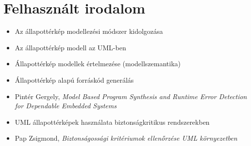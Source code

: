 \begin{fektetett}
\end{fektetett}



%

\section*{Felhasznált irodalom}

\begin{itemize}
	\item Az állapottérkép modellezési módszer kidolgozása~\cite{DBLP:journals/scp/Harel87, DBLP:conf/hopl/Harel07}
	\item Az állapottérkép modell az UML-ben~\cite{UML}
	\item Állapottérkép modellek értelmezése (modellszemantika)~\cite{DBLP:conf/fmoods/LatellaMM99, DBLP:conf/acsd/DubrovinJ08, DBLP:conf/lics/HarelPSS87}
	\item Állapottérkép alapú forráskód generálás~\cite{samak2008practical}
	\item Pintér Gergely, \emph{Model Based Program Synthesis and Runtime Error Detection for Dependable Embedded Systems}~\cite{PinterGergelyPhD}
	\item UML állapottérképek használata biztonságkritikus rendszerekben~\cite{knight1997formal, DBLP:conf/icre/NobeW96}
	\item Pap Zsigmond, \emph{Biztonságossági kritériumok ellenőrzése UML környezetben}~\cite{PapZsigmondPhD}
\end{itemize}
